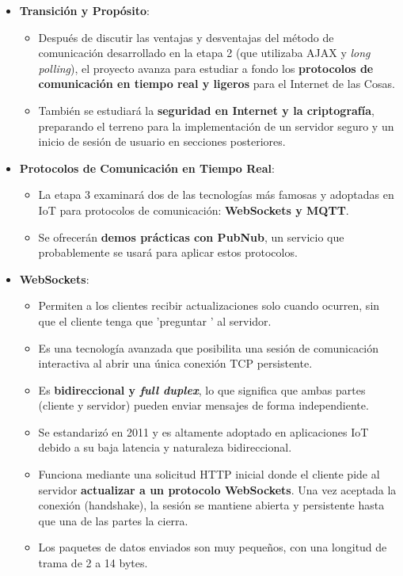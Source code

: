 \documentclass{report}
\begin{document}
\begin{itemize}
    \item \textbf{Transición y Propósito}:
    \begin{itemize}
        \item Después de discutir las ventajas y desventajas del método de comunicación desarrollado en la etapa 2 (que utilizaba AJAX y 
        \textit{long polling}), el proyecto avanza para estudiar a fondo los \textbf{protocolos de comunicación en tiempo real y ligeros} para el 
        Internet de las Cosas.
        \item También se estudiará la \textbf{seguridad en Internet y la criptografía}, preparando el terreno para la implementación de un servidor 
        seguro y un inicio de sesión de usuario en secciones posteriores.
    \end{itemize}

    \item \textbf{Protocolos de Comunicación en Tiempo Real}:
    \begin{itemize}
        \item La etapa 3 examinará dos de las tecnologías más famosas y adoptadas en IoT para protocolos de comunicación: \textbf{WebSockets y MQTT}.
        \item Se ofrecerán \textbf{demos prácticas con PubNub}, un servicio que probablemente se usará para aplicar estos protocolos.
    \end{itemize}

    \item \textbf{WebSockets}:
    \begin{itemize}
        \item Permiten a los clientes recibir actualizaciones solo cuando ocurren, sin que el cliente tenga que  'preguntar ' al servidor.
        \item Es una tecnología avanzada que posibilita una sesión de comunicación interactiva al abrir una única conexión TCP persistente.
        \item Es \textbf{bidireccional y \textit{full duplex}}, lo que significa que ambas partes (cliente y servidor) pueden enviar mensajes de forma 
        independiente.
        \item Se estandarizó en 2011 y es altamente adoptado en aplicaciones IoT debido a su baja latencia y naturaleza bidireccional.
        \item Funciona mediante una solicitud HTTP inicial donde el cliente pide al servidor \textbf{actualizar a un protocolo WebSockets}. Una vez 
        aceptada la conexión (handshake), la sesión se mantiene abierta y persistente hasta que una de las partes la cierra.
        \item Los paquetes de datos enviados son muy pequeños, con una longitud de trama de 2 a 14 bytes.
    \end{itemize}


\end{itemize}
\end{document}
